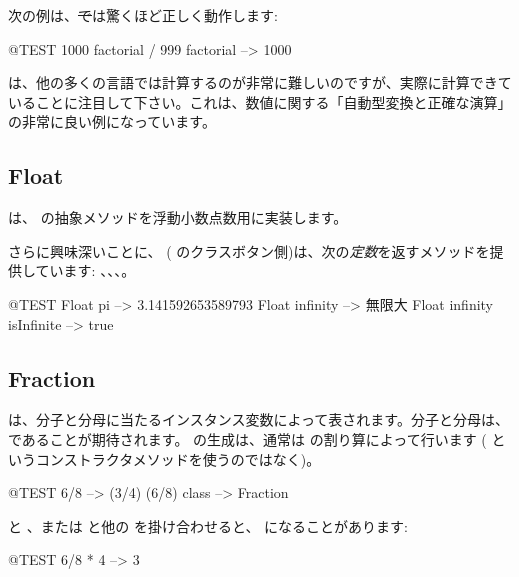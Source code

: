 \documentclass[a4paper,10pt,twoside]{book}
\begin{document}
次の例は、\st では驚くほど正しく動作します:
\begin{code}{@TEST}
1000 factorial / 999 factorial --> 1000
\end{code}
 は、他の多くの言語では計算するのが非常に難しいのですが、実際に計算できていることに注目して下さい。これは、数値に関する「自動型変換と正確な演算」の非常に良い例になっています。


\subsection{Float}

 は、 の抽象メソッドを浮動小数点数用に実装します。

さらに興味深いことに、 (\ie{} のクラスボタン側)は、次の\emph{定数}を返すメソッドを提供しています: 、、、。

\begin{code}{@TEST}
Float pi                      --> 3.141592653589793
Float infinity               --> 無限大
Float infinity isInfinite --> true
\end{code}

\subsection{Fraction}

 は、分子と分母に当たるインスタンス変数によって表されます。分子と分母は、 であることが期待されます。 の生成は、通常は  の割り算によって行います ( というコンストラクタメソッドを使うのではなく)。

\begin{code}{@TEST}
6/8             --> (3/4)
(6/8) class --> Fraction
\end{code}

 と 、または  と他の  を掛け合わせると、 になることがあります:

\begin{code}{@TEST}
6/8 * 4 --> 3
\end{code}
\end{document}
